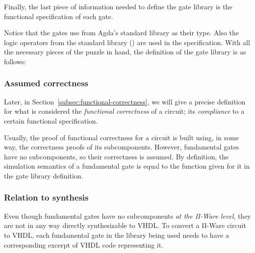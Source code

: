             Finally, the last piece of information needed to define the gate library is
            the functional specification of each gate.

            \begin{center}
            \end{center}

            Notice that the gates use  from Agda's standard library as their  type.
            Also the logic operators from the standard library () are used in the specification.
            With all the necessary pieces of the puzzle in hand, the definition of the 
            gate library is as follows:

            \begin{center}
            \end{center}

            \subsubsection{Assumed correctness}
            \label{subsubsec:gates-assumed-correctness}
            Later, in Section~\ref{subsec:functional-correctness}, we will give a precise definition
            for what is considered the \emph{functional correctness} of a circuit; its \emph{compliance}
            to a certain functional specification.

            Usually, the proof of functional correctness for a circuit is built using, in some way,
            the correctness proofs of its subcomponents.
            However, fundamental gates have no subcomponents, so their correctness is assumed.
            By definition, the simulation semantics of a fundamental gate is equal to the 
            function given for it in the gate library definition.

            \subsubsection{Relation to synthesis}
            \label{subsubsec:relation-to-synthesis}
            Even though fundamental gates have no subcomponents \emph{at the Π-Ware level},
            they are not in any way directly synthesizable to \ac{VHDL}.
            To convert a Π-Ware circuit to \ac{VHDL}, each fundamental gate in the library being used
            needs to have a corresponding excerpt of \ac{VHDL} code representing it.

